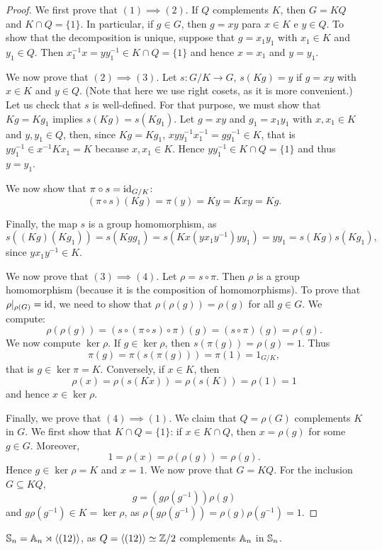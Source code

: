 \begin{proof}
We first prove that $(1)\implies(2)$. If $Q$ complements $K$, then $G=KQ$ and
$K\cap Q=\{1\}$. In particular, if $g\in G$, then $g=xy$ para $x\in K$ e $y\in Q$. To show that
the decomposition is unique, suppose that 
$g=x_1y_1$ with $x_1\in K$ and $y_1\in Q$. Then $x_1^{-1}x=yy_1^{-1}\in K\cap Q=\{1\}$ 
and hence $x=x_1$ and $y=y_1$.


We now prove that $(2)\implies(3)$. Let $s\colon G/K\to G$, $s(Kg)=y$ if 
$g=xy$ with $x\in K$ and $y\in Q$. (Note that here we use right cosets, as it is more convenient.)
Let us check that $s$ is well-defined. 
For that purpose, we must show that $Kg=Kg_1$ implies $s(Kg)=s(Kg_1)$. Let $g=xy$ 
and $g_1=x_1y_1$ with $x,x_1\in K$ and $y,y_1\in Q$, then, since $Kg=Kg_1$, 
$xyy_1^{-1}x_1^{-1}=gg_1^{-1}\in K$, that is $yy_1^{-1}\in x^{-1}Kx_1=K$
 because $x,x_1\in K$. Hence $yy_1^{-1}\in K\cap Q=\{1\}$ and thus $y=y_1$. 
 
 We now show that $\pi\circ
 s=\operatorname{id}_{G/K}$:
\[
(\pi\circ s)(Kg)=\pi(y)=Ky=Kxy=Kg.
\]

Finally, the map 
$s$ is a group homomorphism, as 
\[
s((Kg)(Kg_1))=s(Kgg_1)=s(Kx(yx_1y^{-1})yy_1)=yy_1=s(Kg)s(Kg_1),
\]
since $yx_1y^{-1}\in K$. 


We now prove that $(3)\implies(4)$. Let $\rho=s\circ\pi$. Then $\rho$ is a group homomorphism (because it is the composition of homomorphisms). 
To prove that $\rho|_{\rho(G)}=\operatorname{id}$, we need to show that $\rho(\rho(g))=\rho(g)$ for all $g\in G$. 
We compute: 
\[
\rho(\rho(g))=(s\circ(\pi\circ s)\circ\pi)(g)=(s\circ\pi)(g)=\rho(g).
\]
We now compute $\ker\rho$. If $g\in\ker\rho$, then $s(\pi(g))=\rho(g)=1$. Thus 
\[
\pi(g)=\pi(s(\pi(g)))=\pi(1)=1_{G/K},
\]
that is $g\in\ker\pi=K$. Conversely, if $x\in K$, then
\[
\rho(x)=\rho(s(Kx))=\rho(s(K))=\rho(1)=1
\]
and hence $x\in\ker\rho$.

Finally, we prove that $(4)\implies(1)$. We claim that $Q=\rho(G)$ complements $K$ in
 $G$. We first show that $K\cap Q=\{1\}$: if $x\in K\cap Q$, then $x=\rho(g)$ for some $g\in G$. Moreover, 
\[
1=\rho(x)=\rho(\rho(g))=\rho(g).
\]
Hence $g\in\ker\rho=K$ and $x=1$. We now prove that $G=KQ$. For the inclusion $G\subseteq KQ$, 
\[
g=(g\rho(g^{-1}))\rho(g)
\]
and $g\rho(g^{-1})\in K=\ker\rho$, as $\rho(g\rho(g^{-1}))=  \rho(g)\rho(g^{-1})=1$.
\end{proof}

\begin{example}
$\mathbb{S}_n=\mathbb{A}_n\rtimes\langle(12)\rangle$, as $Q=\langle (12)\rangle\simeq\mathbb{Z}/2$ complements 
$\mathbb{A}_n$ in $\mathbb{S}_n$.
\end{example}

